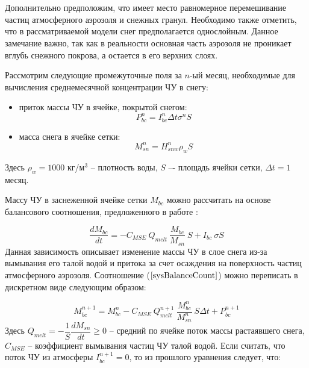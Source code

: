 \documentclass[a4paper, fontsize=14pt]{scrartcl}
\begin{document}
\\ ~

Дополнительно предположим, что имеет место равномерное перемешивание частиц атмосферного аэрозоля и снежных гранул. Необходимо также отметить, что в рассматриваемой модели снег предполагается однослойным. Данное замечание важно, так как в реальности основная часть аэрозоля не проникает вглубь снежного покрова, а остается в его верхних слоях.

\newpage
Рассмотрим следующие промежуточные поля за $n$-ый месяц, необходимые для вычисления среднемесячной концентрации ЧУ в снегу: 
\begin{itemize}
    \item приток массы ЧУ в ячейке, покрытой снегом:
    \begin{equation}
        P_{bc}^n = I_{bc}^n \Delta t \sigma^n S   \label{sys}
    \end{equation}
    \item масса снега в ячейке сетки:
    \begin{equation}
        M_{sn}^n = H_{snw}^n \rho_w S   \label{sys}
    \end{equation}
\end{itemize} 
Здесь $\rho_w = 1000$ кг/м$^3$ -- плотность воды, $S$ –- площадь ячейки сетки, $\Delta t = 1$ месяц.
    
Массу ЧУ в заснеженной ячейке сетки $M_{bc}$ можно рассчитать на основе балансового соотношения, предложенного в работе \cite{Flanner2007}:

\begin{equation}
    \dfrac{d M_{bc}}{d t} = - C_{MSE} ~ Q_{melt} ~ \dfrac{M_{bc}}{M_{sn}} ~ S + I_{bc} ~ \sigma S     \label{sysBalanceCount}
\end{equation}
Данная зависимость описывает изменение массы ЧУ в слое снега из-за вымывания его талой водой и притока за счет осаждения на поверхность частиц атмосферного аэрозоля. Соотношение ($\ref{sysBalanceCount}$) можно переписать в дискретном виде следующим образом:

\begin{equation}
   M_{bc}^{n+1} = M_{bc}^n - C_{MSE} ~ Q_{melt}^{n+1} ~ \dfrac{M_{bc}^n}{M_{sn}^n} ~ S \Delta t + P_{bc}^{n+1}     \label{sysBalance}
\end{equation}
Здесь $Q_{melt} = - \dfrac{1}{S} \dfrac{dM_{sn}}{dt} \geq 0$ --  средний по ячейке поток массы растаявшего снега, $C_{MSE}$ -- коэффициент вымывания частиц ЧУ талой водой. Если считать, что поток ЧУ из атмосферы $I_{bc}^{n + 1} = 0$, то из прошлого уравнения следует, что:
\end{document}
